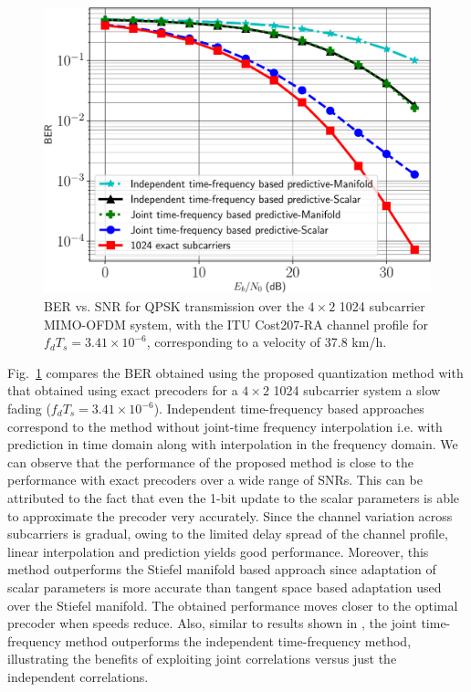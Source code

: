 \documentclass[journal,10pt,twocolumn]{IEEEtran}
\begin{document}
\begin{figure}
\begin{center}
\includegraphics[width=0.71\columnwidth]{images/1024final_withtime}
\caption{BER vs. SNR for QPSK transmission over the $4\times 2$ 1024
  subcarrier MIMO-OFDM system, with the ITU Cost207-RA channel profile
  for $f_dT_s = 3.41\times 10^{-6}$, corresponding to a velocity of 37.8 km/h.}
\label{fig:ber_ped}
\end{center}
\end{figure}

Fig.~\ref{fig:ber_ped} compares the BER obtained using the proposed
quantization method with that obtained using exact precoders for a
$4\times 2$ 1024 subcarrier system a slow fading
($f_dT_s = 3.41 \times 10^{-6}$). Independent time-frequency based approaches correspond to the method without joint-time frequency interpolation i.e. with prediction in time domain along with interpolation in the frequency domain.
We can observe that the performance of the proposed
method is close to the performance with exact precoders over a wide
range of SNRs. This can be attributed to the fact that even the 1-bit
update to the scalar parameters is able to approximate the precoder
very accurately. Since the channel variation across subcarriers is
gradual, owing to the limited delay spread of the channel profile,
linear interpolation and prediction yields good performance. Moreover,
this method outperforms the Stiefel manifold based approach since
adaptation of scalar parameters is more accurate than tangent space
based adaptation used over the Stiefel manifold. The obtained
performance moves closer to the optimal precoder when speeds reduce.
Also, similar to results shown in \cite{Gupt1905:Predictive}, the
joint time-frequency method outperforms the independent time-frequency
method, illustrating the benefits of exploiting joint correlations
versus just the independent correlations.
\end{document}
